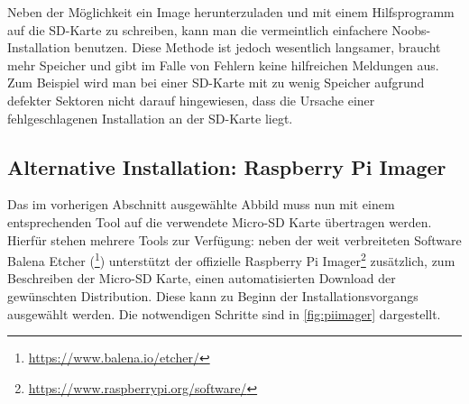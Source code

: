 Neben der Möglichkeit ein Image herunterzuladen und mit einem Hilfsprogramm auf die SD-Karte zu schreiben, kann man die vermeintlich einfachere Noobs-Installation benutzen. Diese Methode ist jedoch wesentlich langsamer, braucht mehr Speicher und gibt im Falle von Fehlern keine hilfreichen Meldungen aus. Zum Beispiel wird man bei einer SD-Karte mit zu wenig Speicher aufgrund defekter Sektoren nicht darauf hingewiesen, dass die Ursache einer fehlgeschlagenen Installation an der SD-Karte liegt. 

\subsection{Alternative Installation: Raspberry Pi Imager}
Das im vorherigen Abschnitt ausgewählte Abbild muss nun mit einem entsprechenden Tool auf die verwendete Micro-SD Karte übertragen werden. Hierfür stehen mehrere Tools zur Verfügung: neben der weit verbreiteten Software Balena Etcher (\footnote{\url{https://www.balena.io/etcher/}}) unterstützt der offizielle Raspberry Pi Imager\footnote{\url{https://www.raspberrypi.org/software/}} zusätzlich, zum Beschreiben der Micro-SD Karte,  einen automatisierten Download der gewünschten Distribution. Diese kann zu Beginn der Installationsvorgangs ausgewählt werden. Die notwendigen Schritte sind in \cref{fig:piimager} dargestellt.

